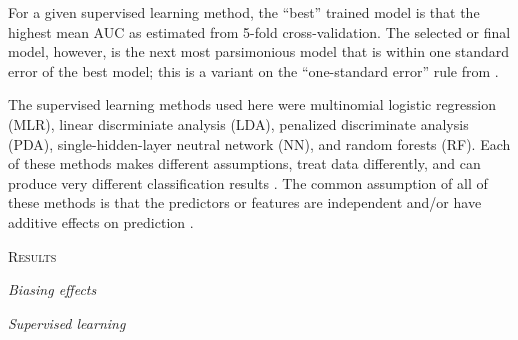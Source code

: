 \documentclass[12pt,letterpaper]{article}
\renewcommand{\section}[1]{%
\bigskip
\begin{center}
\begin{Large}
\normalfont\scshape #1
\medskip
\end{Large}
\end{center}}
\renewcommand{\subsection}[1]{%
\bigskip
\begin{center}
\begin{large}
\normalfont\itshape #1
\end{large}
\end{center}}
\begin{document}
For a given supervised learning method, the ``best'' trained model is that the highest mean AUC as estimated from 5-fold cross-validation. The selected or final model, however, is the next most parsimonious model that is within one standard error of the best model; this is a variant on the ``one-standard error'' rule from \citet{Hastie2009}.

The supervised learning methods used here were multinomial logistic regression (MLR), linear discrminiate analysis (LDA), penalized discriminate analysis (PDA), single-hidden-layer neutral network (NN), and random forests (RF). Each of these methods makes different assumptions, treat data differently, and can produce very different classification results \citep{Hastie2009}. The common assumption of all of these methods is that the predictors or features are independent and/or have additive effects on prediction \citep{Hastie2009}.



\section{Results}

\subsection{Biasing effects}

\subsection{Supervised learning}
\end{document}
